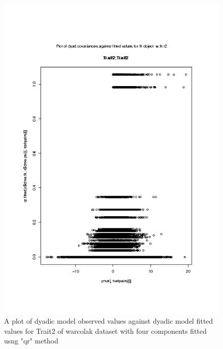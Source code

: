 %

\begin{figure}[h]
  \centering
  \includegraphics[width=1.1\textwidth]{Rplot005.png}
  \caption{A plot of dyadic model observed values against dyadic model fitted values
     for Trait2 of warcolak dataset with four components fitted usng "qr" method}
  \label{fig:5}
\end{figure}

%

